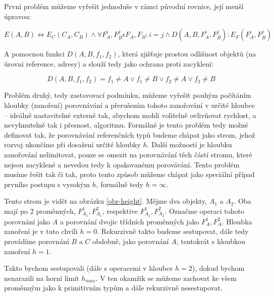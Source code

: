 První problém můžeme vyřešit jednoduše v rámci původní rovnice, její menší úpravou:

\begin{equation}
E(A, B) \Leftrightarrow E_C(C_A, C_B) \wedge \forall F_A^i, F_B^j \epsilon F_A, F_B: i = j \wedge D(A, B, F_A^i, F_B^j) : E_F(F_A^i, F_B^j)
\end{equation}

A pomocnou funkci $D(A, B, f_1, f_2)$, která zjišťuje prostou odlišnost objektů (na úrovni reference, adresy) a slouží tedy jako ochrana proti zacyklení:

\begin{equation}
    D(A, B, f_1, f_2) = f_1 \neq A \vee f_1 \neq B \vee f_2 \neq A \vee f_2 \neq B
\end{equation}

Problém druhý, tedy zastavovací podmínku, můžeme vyřešit pouhým počítáním hloubky (zanoření) porovnávání a přerušením tohoto zanořování v určité hloubce -- ideálně nastavitelné externě tak, abychom mohli volitelně ovlivňovat rychlost, a nevyhnutelně tak i přesnost, algoritmu. Formálně je tento problém tedy možné definovat tak, že porovnávání referenčních typů budeme chápat jako strom, jehož rozvoj ukončíme při dosažení určité hloubky $h$. Další možností je hloubku zanořování nelimitovat, pouze se omezit na porovnávání těch částí stromu, které nejsou zacyklené a nevedou tedy k opakovanému porovávání. Tento problém musíme řešit tak či tak, proto tento způsob můžeme chápat jako speciální případ prvního postupu s vysokým $h$, formálně tedy $h=\infty$.

Tento strom je vidět na obrázku \ref{obr-height}. Mějme dva objekty, $A_1$ a $A_2$. Oba mají po 2 proměnných, $F_{A_1}^1, F_{A_1}^2$, respektive $F_{A_2}^1, F_{A_2}^2$. Označme operaci tohoto porovnání jako $A$ a porovnání dvojic třídních proměnných jako $F_A^1, F_A^2$. Hloubka zanoření je v tuto chvíli $h=0$. Rekurzivně takto budeme sestupovat, dále tedy provádíme porovnání $B$ a $C$ obdobně, jako porovnání $A$, tentokrát s hloubkou zanoření $h=1$.

Takto bychom sestupovali (dále s operacemi v hloubce $h=2$), dokud bychom nenarazili na horní limit $h_{max}$. V ten okamžik se můžeme zachovat ke všem proměnným jako k primitivním typům a dále rekurzivně nesestupovat.

